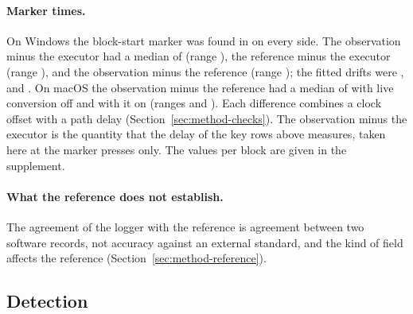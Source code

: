 \paragraph{Marker times.} On Windows the block-start marker was found in
 on every side. The observation minus the executor had a median of
 (range ), the reference
minus the executor  (range ),
and the observation minus the reference  (range
); the fitted drifts were ,
 and . On macOS the
observation minus the reference had a median of  with live conversion
off and  with it on (ranges
 and ). Each difference
combines a clock offset with a path delay (Section~\ref{sec:method-checks}). The observation minus the executor is the
quantity that the delay of the key rows above measures, taken here at the marker presses only. The values per block
are given in the supplement.

\paragraph{What the reference does not establish.} The agreement of the logger with the reference is agreement between
two software records, not accuracy against an external standard, and the kind of field affects the reference
(Section~\ref{sec:method-reference}).




\subsection{Detection}
\label{sec:results-detection}

